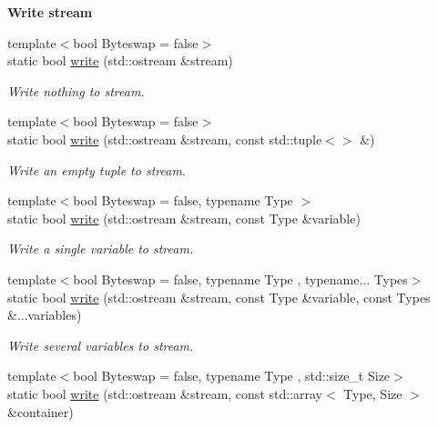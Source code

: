 \begin{Indent}{\bf Write stream}\par
\begin{DoxyCompactItemize}
\item 
{\footnotesize template$<$bool Byteswap = false$>$ }\\static bool \hyperlink{exceptionmagrathea_1_1DataHandler_a39a75e50677e501aa45368fcd1a9072c}{write} (std\-::ostream \&stream)
\begin{DoxyCompactList}\small\item\em Write nothing to stream. \end{DoxyCompactList}\item 
{\footnotesize template$<$bool Byteswap = false$>$ }\\static bool \hyperlink{exceptionmagrathea_1_1DataHandler_ac03218d9c590597427d31e8d7fe8820b}{write} (std\-::ostream \&stream, const std\-::tuple$<$$>$ \&)
\begin{DoxyCompactList}\small\item\em Write an empty tuple to stream. \end{DoxyCompactList}\item 
{\footnotesize template$<$bool Byteswap = false, typename Type $>$ }\\static bool \hyperlink{exceptionmagrathea_1_1DataHandler_a921c83976ebf7a55119f25d9589a6d71}{write} (std\-::ostream \&stream, const Type \&variable)
\begin{DoxyCompactList}\small\item\em Write a single variable to stream. \end{DoxyCompactList}\item 
{\footnotesize template$<$bool Byteswap = false, typename Type , typename... Types$>$ }\\static bool \hyperlink{exceptionmagrathea_1_1DataHandler_aee67cc8c281a41a493d41a4a25f45bc9}{write} (std\-::ostream \&stream, const Type \&variable, const Types \&...variables)
\begin{DoxyCompactList}\small\item\em Write several variables to stream. \end{DoxyCompactList}\item 
{\footnotesize template$<$bool Byteswap = false, typename Type , std\-::size\-\_\-t Size$>$ }\\static bool \hyperlink{exceptionmagrathea_1_1DataHandler_a1ab61e11c5cd55fa2652511507291435}{write} (std\-::ostream \&stream, const std\-::array$<$ Type, Size $>$ \&container)
$$
\end{DoxyCompactItemize}
\end{Indent}
